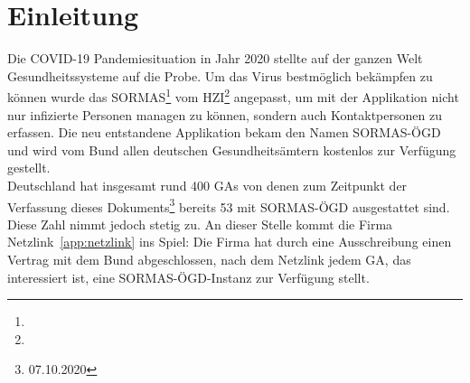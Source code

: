 \chapter{Einleitung}

Die \ac{COVID-19} Pandemiesituation in Jahr 2020 stellte auf der ganzen Welt Gesundheitssysteme auf die Probe. 
Um das Virus bestmöglich bekämpfen zu können wurde das \ac{SORMAS}\footnote{} vom \ac{HZI}\footnote{} angepasst, um mit der Applikation nicht nur infizierte Personen managen zu können, sondern auch Kontaktpersonen zu erfassen.
Die neu entstandene Applikation bekam den Namen \ac{SORMAS-ÖGD} und wird vom Bund allen deutschen Gesundheitsämtern kostenlos zur Verfügung gestellt. 
\cite{SORMAS_covid}
\\
Deutschland hat insgesamt rund 400 \ac{GAs} \cite{GAs} von denen zum Zeitpunkt der Verfassung dieses Dokuments\footnote{07.10.2020} bereits 53 mit \ac{SORMAS-ÖGD} ausgestattet sind.
Diese Zahl nimmt jedoch stetig zu.  
An dieser Stelle kommt die Firma Netzlink~\ref{app:netzlink} ins Spiel: 
Die Firma hat durch eine Ausschreibung einen Vertrag mit dem Bund abgeschlossen, nach dem Netzlink jedem \ac{GA}, das interessiert ist, eine \ac{SORMAS-ÖGD}-Instanz zur Verfügung stellt.

